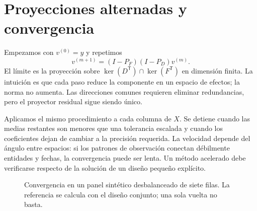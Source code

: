 \documentclass[11pt,a4paper]{article}
\newcommand{\T}{^{\mathsf T}}
\theoremstyle{definition}
\begin{document}
\section{Proyecciones alternadas y convergencia}
Empezamos con $v^{(0)}=y$ y repetimos
\[
v^{(m+1)}=(I-P_F)(I-P_D)v^{(m)}.
\]
El límite es la proyección sobre
$\ker(D\T)\cap\ker(F\T)$ en dimensión finita.
La intuición es que cada paso reduce la componente en un espacio de efectos; la norma no aumenta. Las direcciones comunes requieren eliminar redundancias, pero el proyector residual sigue siendo único.

Aplicamos el mismo procedimiento a cada columna de $X$.
Se detiene cuando las medias restantes son menores que una tolerancia escalada y cuando los coeficientes dejan de cambiar a la precisión requerida.
La velocidad depende del ángulo entre espacios: si los patrones de observación conectan débilmente entidades y fechas, la convergencia puede ser lenta. Un método acelerado debe verificarse respecto de la solución de un diseño pequeño explícito.



\begin{figure}[htbp]\centering
{}
\caption{Convergencia en un panel sintético desbalanceado de siete filas. La referencia se calcula con el diseño conjunto; una sola vuelta no basta.}\label{fig:panel-11}
\end{figure}
\end{document}
